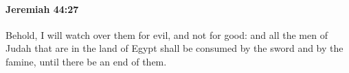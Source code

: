 
		\paragraph{Jeremiah 44:27} %
			\label{JEREMIAH-44-27}

			Behold, I will watch over them for evil, and not for good: and all the men of Judah that are in the land of Egypt shall be consumed by the sword and by the famine, until there be an end of them.



